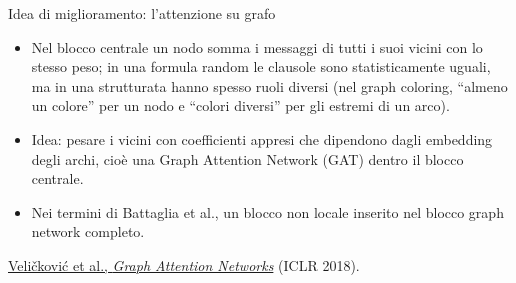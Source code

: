 \documentclass[aspectratio=169]{beamer}
\newcommand{\T}[2]{#2}
\newcommand{\T}[2]{#1}
\begin{document}
\begin{frame}{\T{Improvement idea: graph attention}{Idea di miglioramento: l'attenzione su grafo}}
  \begin{itemize}
    \item \T{In the core block a node sums the messages of all its neighbors with the same
          weight; on a random formula the clauses are statistically alike, but in a
          structured one they often play different roles (in graph coloring, ``at least one
          color'' for a node and ``different colors'' for the ends of an edge).}%
          {Nel blocco centrale un nodo somma i messaggi di tutti i suoi vicini con lo stesso
          peso; in una formula random le clausole sono statisticamente uguali, ma in una
          strutturata hanno spesso ruoli diversi (nel graph coloring, ``almeno un colore'' per
          un nodo e ``colori diversi'' per gli estremi di un arco).}
    \item \T{Idea: weight the neighbors by learned coefficients that depend on the edge
          embeddings, i.e., a Graph Attention Network (GAT) inside the core block.}%
          {Idea: pesare i vicini con coefficienti appresi che dipendono dagli embedding degli
          archi, cio\`e una Graph Attention Network (GAT) dentro il blocco centrale.}
    \item \T{In the terms of Battaglia et al., a non-local block inserted in the full
          graph-network block.}%
          {Nei termini di Battaglia et al., un blocco non locale inserito nel blocco graph
          network completo.}
  \end{itemize}
  \vfill
  {\footnotesize\color{gray} \href{https://arxiv.org/abs/1710.10903}{Veli\v{c}kovi\'c et al.,
  \emph{Graph Attention Networks}} (ICLR 2018).}
\end{frame}
\end{document}
